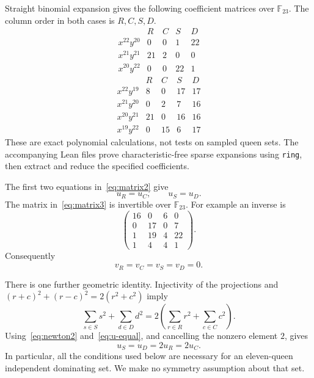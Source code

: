\documentclass[11pt,a4paper]{article}
\theoremstyle{remark}
\newcommand{\F}{\mathbb F_{23}}
\begin{document}
Straight binomial expansion gives the following coefficient matrices over $\F$.
The column order in both cases is $R,C,S,D$.
\begin{equation}\label{eq:matrix2}
 \begin{array}{c|rrrr}
  &R&C&S&D\\\hline
  x^{22}y^{20}&0&0&1&22\\
  x^{21}y^{21}&21&2&0&0\\
  x^{20}y^{22}&0&0&22&1
 \end{array}
\end{equation}
\begin{equation}\label{eq:matrix3}
 \begin{array}{c|rrrr}
  &R&C&S&D\\\hline
  x^{22}y^{19}&8&0&17&17\\
  x^{21}y^{20}&0&2&7&16\\
  x^{20}y^{21}&21&0&16&16\\
  x^{19}y^{22}&0&15&6&17
 \end{array}
\end{equation}
These are exact polynomial calculations, not tests on sampled queen sets.
The accompanying Lean files prove characteristic-free sparse expansions using
\texttt{ring}, then extract and reduce the specified coefficients.

The first two equations in~\eqref{eq:matrix2} give
\begin{equation}\label{eq:u-equal}
 u_R=u_C,\qquad u_S=u_D.
\end{equation}
The matrix in~\eqref{eq:matrix3} is invertible over $\F$. For example an inverse is
\begin{equation}\label{eq:inverse3}
 \begin{pmatrix}
 16&0&6&0\\
 0&17&0&7\\
 1&19&4&22\\
 1&4&4&1
 \end{pmatrix}.
\end{equation}
Consequently
\begin{equation}\label{eq:v-zero}
 v_R=v_C=v_S=v_D=0.
\end{equation}

There is one further geometric identity. Injectivity of the projections and
$(r+c)^2+(r-c)^2=2(r^2+c^2)$ imply
\[
 \sum_{s\in S}s^2+\sum_{d\in D}d^2
   =2\left(\sum_{r\in R}r^2+\sum_{c\in C}c^2\right).
\]
Using~\eqref{eq:newton2} and~\eqref{eq:u-equal}, and cancelling the nonzero
element $2$, gives
\begin{equation}\label{eq:u-double}
 u_S=u_D=2u_R=2u_C.
\end{equation}
In particular, all the conditions used below are necessary for an eleven-queen
independent dominating set. We make no symmetry assumption about that set.
\end{document}
